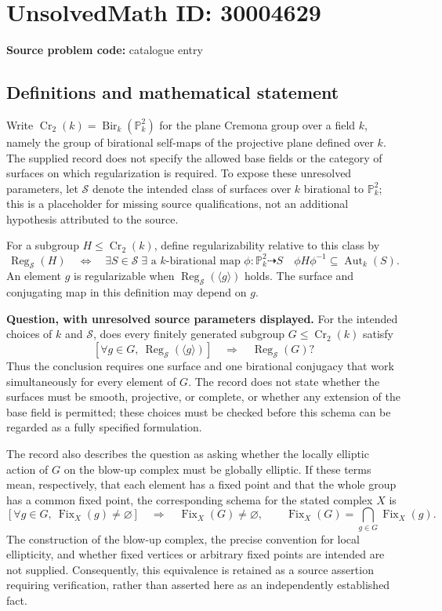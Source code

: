 \documentclass[11pt]{article}
\newcommand{\PP}{\mathbb{P}}
\begin{document}
\section*{UnsolvedMath ID: 30004629}
\textbf{Source problem code:} catalogue entry
\subsection{Definitions and mathematical statement}
Write \(\operatorname{Cr}_2(k)=\operatorname{Bir}_k(\PP^2_k)\) for the plane Cremona group over a field \(k\), namely the group of birational self-maps of the projective plane defined over \(k\). The supplied record does not specify the allowed base fields or the category of surfaces on which regularization is required. To expose these unresolved parameters, let \(\mathcal S\) denote the intended class of surfaces over \(k\) birational to \(\PP^2_k\); this is a placeholder for missing source qualifications, not an additional hypothesis attributed to the source.

For a subgroup \(H\leq\operatorname{Cr}_2(k)\), define regularizability relative to this class by
\[
\operatorname{Reg}_{\mathcal S}(H)
\quad\Longleftrightarrow\quad
\exists S\in\mathcal S\;\exists\text{ a }k\text{-birational map }\phi:\PP^2_k\dashrightarrow S
\quad \phi H\phi^{-1}\subseteq\operatorname{Aut}_k(S).
\]
An element \(g\) is regularizable when \(\operatorname{Reg}_{\mathcal S}(\langle g\rangle)\) holds. The surface and conjugating map in this definition may depend on \(g\).

\textbf{Question, with unresolved source parameters displayed.} For the intended choices of \(k\) and \(\mathcal S\), does every finitely generated subgroup \(G\leq\operatorname{Cr}_2(k)\) satisfy
\[
\left[\forall g\in G,\ \operatorname{Reg}_{\mathcal S}(\langle g\rangle)\right]
\quad\Longrightarrow\quad
\operatorname{Reg}_{\mathcal S}(G)?
\]
Thus the conclusion requires one surface and one birational conjugacy that work simultaneously for every element of \(G\). The record does not state whether the surfaces must be smooth, projective, or complete, or whether any extension of the base field is permitted; these choices must be checked before this schema can be regarded as a fully specified formulation.

The record also describes the question as asking whether the locally elliptic action of \(G\) on the blow-up complex must be globally elliptic. If these terms mean, respectively, that each element has a fixed point and that the whole group has a common fixed point, the corresponding schema for the stated complex \(X\) is
\[
\left[\forall g\in G,\ \operatorname{Fix}_X(g)\ne\varnothing\right]
\quad\Longrightarrow\quad
\operatorname{Fix}_X(G)\ne\varnothing,
\qquad
\operatorname{Fix}_X(G)=\bigcap_{g\in G}\operatorname{Fix}_X(g).
\]
The construction of the blow-up complex, the precise convention for local ellipticity, and whether fixed vertices or arbitrary fixed points are intended are not supplied. Consequently, this equivalence is retained as a source assertion requiring verification, rather than asserted here as an independently established fact.
\end{document}
